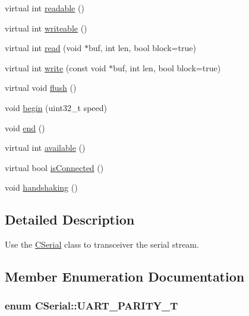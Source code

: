 \begin{DoxyCompactItemize}
\item 
virtual int \hyperlink{class_c_serial_a0748723f610ddcfdc34286dbbfbd4917}{readable} ()
\item 
virtual int \hyperlink{class_c_serial_ac59cfe80216e1fb7eb479017f0bb8e7f}{writeable} ()
\item 
virtual int \hyperlink{class_c_serial_a9b658bf4bc4d81413627bc2fe81e1471}{read} (void $\ast$buf, int len, bool block=true)
\item 
virtual int \hyperlink{class_c_serial_adef6d3e77843c65617b7cb555c2f8732}{write} (const void $\ast$buf, int len, bool block=true)
\item 
virtual void \hyperlink{class_c_serial_a68aecf6351423ae0e8791870c9e694bf}{flush} ()
\item 
void \hyperlink{class_c_serial_a130edee149575f50f62013180a1b5bef}{begin} (uint32\-\_\-t speed)
\item 
void \hyperlink{class_c_serial_a21d6a27113d6370eb3a69c26b28b232a}{end} ()
\item 
virtual int \hyperlink{class_c_serial_a5c142221c0841e7c961e962c45bd2db7}{available} ()
\item 
virtual bool \hyperlink{class_c_serial_ae7c133c4586cd5ca729cd026f813a8a0}{is\-Connected} ()
\item 
void \hyperlink{class_c_serial_a9dc5498e6cae5a2d0d12cb57fc6ee335}{handshaking} ()
\end{DoxyCompactItemize}


\subsection{Detailed Description}
Use the \hyperlink{class_c_serial}{C\-Serial} class to transceiver the serial stream. 

\subsection{Member Enumeration Documentation}
\hypertarget{class_c_serial_ad38b0926868c6cfabb59e2da94f1cf40}{
\subsubsection[{U\-A\-R\-T\-\_\-\-P\-A\-R\-I\-T\-Y\-\_\-\-T}]{\setlength{\rightskip}{0pt plus 5cm}enum {\bf C\-Serial\-::\-U\-A\-R\-T\-\_\-\-P\-A\-R\-I\-T\-Y\-\_\-\-T}}}\label{class_c_serial_ad38b0926868c6cfabb59e2da94f1cf40}


